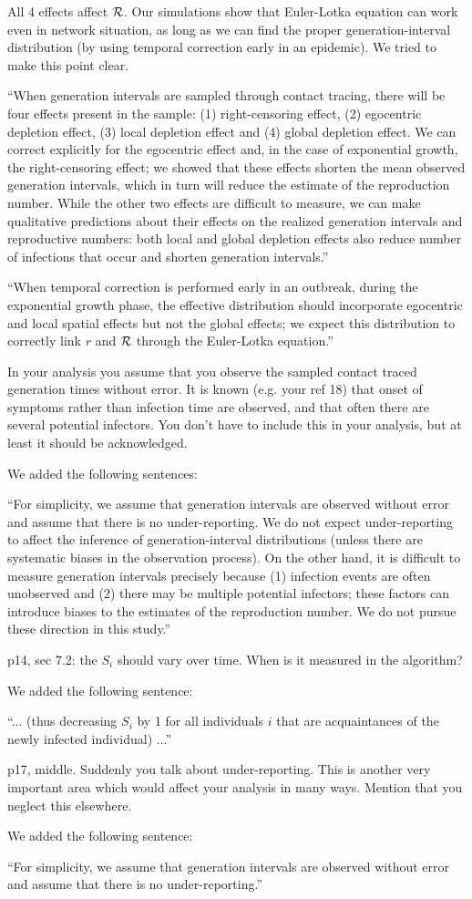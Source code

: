 \documentclass[12pt]{article}
\newcommand{\RR}{\ensuremath{{\cal R}}}
\newcommand{\revtext}{\textsf}
\begin{document}
All 4 effects affect $\RR$. Our simulations show that Euler-Lotka equation can work even in network situation, as long as we can find the proper generation-interval distribution (by using temporal correction early in an epidemic). We tried to make this point clear.

``When generation intervals are sampled through contact tracing, there will be four effects present in the sample: (1) right-censoring effect, (2) egocentric depletion effect, (3) local depletion effect and (4) global depletion effect.
We can correct explicitly for the egocentric effect and, in the case of exponential growth, the right-censoring effect;
we showed that these effects shorten the mean observed generation intervals, which in turn will reduce the estimate of the reproduction number.
While the other two effects are difficult to measure, we can make qualitative predictions about their effects on the realized generation intervals and reproductive numbers: 
both local and global depletion effects also reduce number of infections that occur and shorten generation intervals.''

``When temporal correction is performed early in an outbreak, during the exponential growth phase, the effective distribution should incorporate egocentric and local spatial effects but not the global effects; we expect this distribution to correctly link $r$ and $\RR$ through the Euler-Lotka equation.''

\revtext{In your analysis you assume that you observe the sampled contact traced generation times without error. It is known (e.g. your ref 18) that onset of symptoms rather than infection time are observed, and that often there are several potential infectors. You don't have to include this in your analysis, but at least it should be acknowledged.}

We added the following sentences:

``For simplicity, we assume that generation intervals are observed without error and assume that there is no under-reporting. 
We do not expect under-reporting to affect the inference of generation-interval distributions (unless there are systematic biases in the observation process).
On the other hand, it is difficult to measure generation intervals precisely because (1) infection events are often unobserved and (2) there may be multiple potential infectors; these factors can introduce biases to the estimates of the reproduction number.
We do not pursue these direction in this study.''

\revtext{p14, sec 7.2: the $S_i$ should vary over time. When is it measured in the algorithm?}

We added the following sentence:

``... (thus decreasing $S_i$ by 1 for all individuals $i$ that are acquaintances of the newly infected individual) ...''

\revtext{p17, middle. Suddenly you talk about under-reporting. This is another very important area which would affect your analysis in many ways. Mention that you neglect this elsewhere.
}

We added the following sentence:

``For simplicity, we assume that generation intervals are observed without error and assume that there is no under-reporting.''
\end{document}
